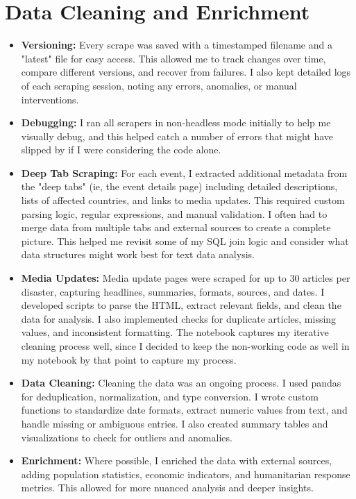 \documentclass[12pt]{article}
\begin{document}
\section{Data Cleaning and Enrichment}
\begin{itemize}
    \item \textbf{Versioning:} Every scrape was saved with a timestamped filename and a "latest" file for easy access. This allowed me to track changes over time, compare different versions, and recover from failures. I also kept detailed logs of each scraping session, noting any errors, anomalies, or manual interventions.
    \item \textbf{Debugging:} I ran all scrapers in non-headless mode initially to help me visually debug, and this helped catch a number of errors that might have slipped by if I were considering the code alone. 
    \item \textbf{Deep Tab Scraping:} For each event, I extracted additional metadata from the "deep tabs" (ie, the event details page) including detailed descriptions, lists of affected countries, and links to media updates. This required custom parsing logic, regular expressions, and manual validation. I often had to merge data from multiple tabs and external sources to create a complete picture. This helped me revisit some of my SQL join logic and consider what data structures might work best for text data analysis.
    \item \textbf{Media Updates:} Media update pages were scraped for up to 30 articles per disaster, capturing headlines, summaries, formats, sources, and dates. I developed scripts to parse the HTML, extract relevant fields, and clean the data for analysis. I also implemented checks for duplicate articles, missing values, and inconsistent formatting. The notebook captures my iterative cleaning process well, since I decided to keep the non-working code as well in my notebook by that point to capture my process.
    \item \textbf{Data Cleaning:} Cleaning the data was an ongoing process. I used pandas for deduplication, normalization, and type conversion. I wrote custom functions to standardize date formats, extract numeric values from text, and handle missing or ambiguous entries. I also created summary tables and visualizations to check for outliers and anomalies.
    \item \textbf{Enrichment:} Where possible, I enriched the data with external sources, adding population statistics, economic indicators, and humanitarian response metrics. This allowed for more nuanced analysis and deeper insights.
\end{itemize}
\end{document}

